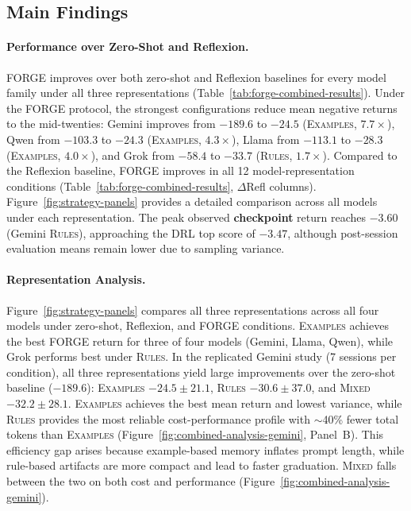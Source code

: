\documentclass[sigconf]{acmart}
\begin{document}
\subsection{Main Findings}
\paragraph{Performance over Zero-Shot and Reflexion.} FORGE improves over both zero-shot and Reflexion baselines for every model family under all three representations (Table~\ref{tab:forge-combined-results}). Under the FORGE protocol, the strongest configurations reduce mean negative returns to the mid-twenties: Gemini improves from $-189.6$ to $-24.5$ (\textsc{Examples}, $7.7\times$), Qwen from $-103.3$ to $-24.3$ (\textsc{Examples}, $4.3\times$), Llama from $-113.1$ to $-28.3$ (\textsc{Examples}, $4.0\times$), and Grok from $-58.4$ to $-33.7$ (\textsc{Rules}, $1.7\times$). Compared to the Reflexion baseline, FORGE improves in all 12 model-representation conditions (Table~\ref{tab:forge-combined-results}, $\Delta$Refl columns). Figure~\ref{fig:strategy-panels} provides a detailed comparison across all models under each representation. The peak observed \textbf{checkpoint} return reaches $-3.60$ (Gemini \textsc{Rules}), approaching the DRL top score of $-3.47$, although post-session evaluation means remain lower due to sampling variance.

\paragraph{Representation Analysis.}
Figure~\ref{fig:strategy-panels} compares all three representations across all four models under zero-shot, Reflexion, and FORGE conditions. \textsc{Examples} achieves the best FORGE return for three of four models (Gemini, Llama, Qwen), while Grok performs best under \textsc{Rules}. In the replicated Gemini study (7 sessions per condition), all three representations yield large improvements over the zero-shot baseline ($-189.6$): \textsc{Examples} $-24.5 \pm 21.1$, \textsc{Rules} $-30.6 \pm 37.0$, and \textsc{Mixed} $-32.2 \pm 28.1$. \textsc{Examples} achieves the best mean return and lowest variance, while \textsc{Rules} provides the most reliable cost-performance profile with $\sim$40\% fewer total tokens than \textsc{Examples} (Figure~\ref{fig:combined-analysis-gemini}, Panel~B). This efficiency gap arises because example-based memory inflates prompt length, while rule-based artifacts are more compact and lead to faster graduation. \textsc{Mixed} falls between the two on both cost and performance (Figure~\ref{fig:combined-analysis-gemini}).
\end{document}
